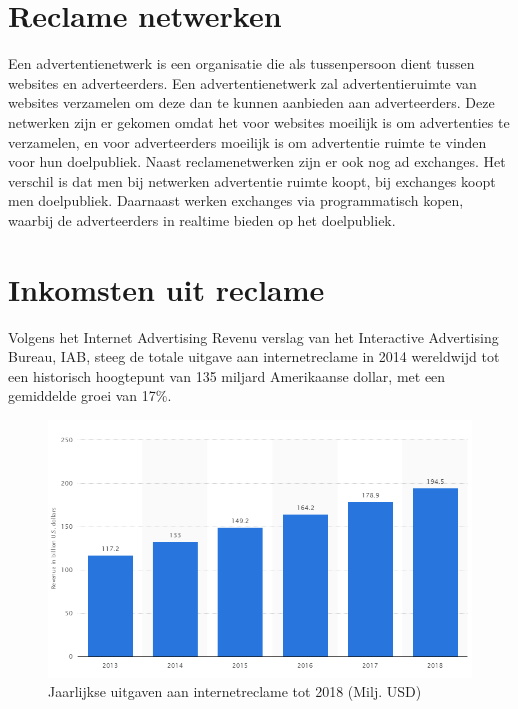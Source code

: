 \documentclass[pdftex,a4paper,12pt,twoside]{report}
\begin{document}
\section{Reclame netwerken}
\label{sec:Reclamenetwerken}
Een advertentienetwerk is een organisatie die als tussenpersoon dient tussen websites en adverteerders. Een advertentienetwerk zal advertentieruimte van websites verzamelen om deze dan te kunnen aanbieden aan adverteerders. Deze netwerken zijn er gekomen omdat het voor websites moeilijk is om advertenties te verzamelen, en voor adverteerders moeilijk is om advertentie ruimte te vinden voor hun doelpubliek. Naast reclamenetwerken zijn er ook nog ad exchanges. Het verschil is dat men bij netwerken advertentie ruimte koopt, bij exchanges koopt men doelpubliek. Daarnaast werken exchanges via programmatisch kopen, waarbij de adverteerders in realtime bieden op het doelpubliek.


\section{Inkomsten uit reclame}
\label{sec:Inkomsten uit reclame}
Volgens het Internet Advertising Revenu verslag \cite{Silverman2015} van het Interactive Advertising Bureau, IAB, steeg de totale uitgave aan internetreclame in 2014 wereldwijd tot een historisch hoogtepunt van 135 miljard Amerikaanse dollar, met een gemiddelde groei van 17\%.

\begin{figure}[h!]
\centering
\includegraphics[width=12cm]{img/AdvertisingRevenueYearly}
\caption{ Jaarlijkse uitgaven aan internetreclame tot 2018 (Milj. USD) }
\label{fig: AdvertisingRevenueYearly}
\end{figure} 
\end{document}
